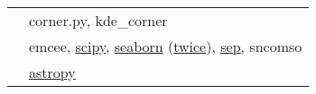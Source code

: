 \documentclass[margin]{res}
\begin{document}
\begin{resume}

\begin{tabular}{l p{4.3in}}
\hspace{-1em}{\bf Source Code:} & 
corner.py, 
kde\_corner \\

\hspace{-1em}{\bf Documentation:} & 
emcee,
\href{https://github.com/scipy/scipy/pull/8011}{scipy},
\href{https://github.com/mwaskom/seaborn/pulls?q=is\%3Apr+author\%3Abenjaminrose}{seaborn} (\href{https://github.com/mwaskom/seaborn/pull/1531}{twice}),
\href{https://github.com/kbarbary/sep/commit/612033788bcce44f110a87e1b54bb70eea9960c2}{sep},
sncomso\\

\hspace{-1em}{\bf Community Member:} & 
\href{https://github.com/astropy/astropy/issues/4976}{astropy} %
\end{tabular}










\end{resume}
\end{document}
